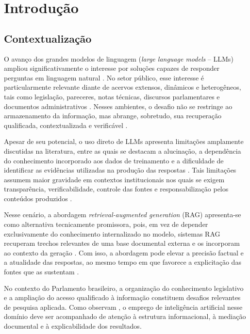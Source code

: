 \section{Introdução}

\subsection{Contextualização}

O avanço dos grandes modelos de linguagem (\textit{large language models} -- LLMs) ampliou significativamente o interesse por soluções capazes de responder perguntas em linguagem natural \parencite{minaee2024llmSurvey}. No setor público, esse interesse é particularmente relevante diante de acervos extensos, dinâmicos e heterogêneos, tais como legislação, pareceres, notas técnicas, discursos parlamentares e documentos administrativos \parencite{ipu2024aiParliaments}. Nesses ambientes, o desafio não se restringe ao armazenamento da informação, mas abrange, sobretudo, sua recuperação qualificada, contextualizada e verificável \parencite{wfd2023guidelinesAiParliaments}.

Apesar de seu potencial, o uso direto de LLMs apresenta limitações amplamente discutidas na literatura, entre as quais se destacam a alucinação, a dependência do conhecimento incorporado aos dados de treinamento e a dificuldade de identificar as evidências utilizadas na produção das respostas \parencite{gao2023ragSurvey}. Tais limitações assumem maior gravidade em contextos institucionais nos quais se exigem transparência, verificabilidade, controle das fontes e responsabilização pelos conteúdos produzidos \parencite{wfd2023guidelinesAiParliaments}.

Nesse cenário, a abordagem \textit{retrieval-augmented generation} (RAG) apresenta-se como alternativa tecnicamente promissora, pois, em vez de depender exclusivamente do conhecimento internalizado no modelo, sistemas RAG recuperam trechos relevantes de uma base documental externa e os incorporam ao contexto da geração \parencite{gao2023ragSurvey}. Com isso, a abordagem pode elevar a precisão factual e a atualidade das respostas, ao mesmo tempo em que favorece a explicitação das fontes que as sustentam \parencite{gao2023ragSurvey}.

No contexto do Parlamento brasileiro, a organização do conhecimento legislativo e a ampliação do acesso qualificado à informação constituem desafios relevantes de pesquisa aplicada. Como observam \textcite{martelloteViola2025organizacaoConhecimento}, o emprego de inteligência artificial nesse domínio deve ser acompanhado de atenção à estrutura informacional, à mediação documental e à explicabilidade dos resultados.

